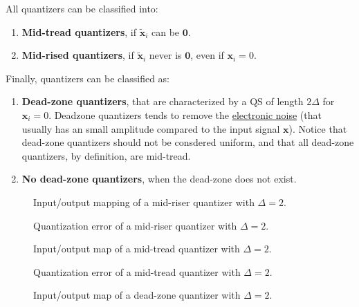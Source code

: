 All quantizers can be classified into:
\begin{enumerate}
\item \textbf{Mid-tread quantizers}, if $\tilde{{\mathbf x}}_i$ can be ${\mathbf 0}$.
\item \textbf{Mid-rised quantizers}, if $\tilde{{\mathbf x}}_i$ never is ${\mathbf 0}$,
  even if ${\mathbf x}_i=0$.
\end{enumerate}

Finally, quantizers can be classified as:
\begin{enumerate}
\item \textbf{Dead-zone quantizers}, that are characterized by a QS of
  length $2\Delta$ for ${\mathbf x}_i=0$. Deadzone quantizers tends to
  remove the
  \href{https://en.wikipedia.org/wiki/Noise_(electronics)}{electronic
    noise} (that usually has an small amplitude compared to the input
  signal ${\mathbf x}$). Notice that dead-zone quantizers should not
  be consdered uniform, and that all dead-zone quantizers, by
  definition, are mid-tread.
\item \textbf{No dead-zone quantizers}, when the dead-zone does not
  exist.
\end{enumerate}

\begin{figure}
  \centering
  \caption{Input/output mapping of a mid-riser quantizer with $\Delta=2$.}
  \label{fig:iomap_mr}
\end{figure}

\begin{figure}
  \centering
  \caption{Quantization error of a mid-riser quantizer with $\Delta=2$.}
  \label{fig:qe_mr}
\end{figure}

\begin{figure}
  \centering
  \caption{Input/output map of a mid-tread quantizer with $\Delta=2$.}
  \label{fig:iomap_mt}
\end{figure}

\begin{figure}
  \centering
  \caption{Quantization error of a mid-tread quantizer with $\Delta=2$.}
  \label{fig:qe_mt}
\end{figure}

\begin{figure}
  \centering
  \caption{Input/output map of a dead-zone quantizer with $\Delta=2$.}
  \label{fig:iomap_dz}
\end{figure}

